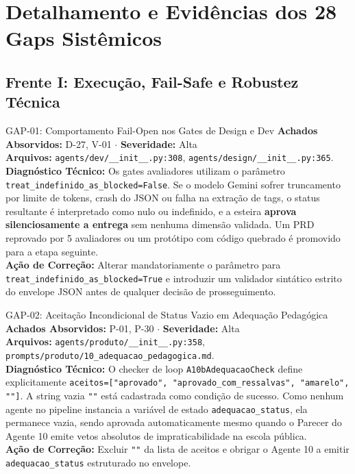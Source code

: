 \documentclass[11pt,a4paper]{article}
\begin{document}
\newpage
\section{Detalhamento e Evidências dos 28 Gaps Sistêmicos}

\subsection{Frente I: Execução, Fail-Safe e Robustez Técnica}

\begin{gapbox}{GAP-01: Comportamento Fail-Open nos Gates de Design e Dev}
\textbf{Achados Absorvidos:} D-27, V-01 $\cdot$ \textbf{Severidade:} Alta\\
\textbf{Arquivos:} \texttt{agents/dev/\_\_init\_\_.py:308}, \texttt{agents/design/\_\_init\_\_.py:365}.\\
\textbf{Diagnóstico Técnico:} Os gates avaliadores utilizam o parâmetro \texttt{treat\_indefinido\_as\_blocked=False}. Se o modelo Gemini sofrer truncamento por limite de tokens, crash do JSON ou falha na extração de tags, o status resultante é interpretado como nulo ou indefinido, e a esteira \textbf{aprova silenciosamente a entrega} sem nenhuma dimensão validada. Um PRD reprovado por 5 avaliadores ou um protótipo com código quebrado é promovido para a etapa seguinte.\\
\textbf{Ação de Correção:} Alterar mandatoriamente o parâmetro para \texttt{treat\_indefinido\_as\_blocked=True} e introduzir um validador sintático estrito do envelope JSON antes de qualquer decisão de prosseguimento.
\end{gapbox}

\begin{gapbox}{GAP-02: Aceitação Incondicional de Status Vazio em Adequação Pedagógica}
\textbf{Achados Absorvidos:} P-01, P-30 $\cdot$ \textbf{Severidade:} Alta\\
\textbf{Arquivos:} \texttt{agents/produto/\_\_init\_\_.py:358}, \texttt{prompts/produto/10\_adequacao\_pedagogica.md}.\\
\textbf{Diagnóstico Técnico:} O checker de loop \texttt{A10bAdequacaoCheck} define explicitamente \texttt{aceitos=["aprovado", "aprovado\_com\_ressalvas", "amarelo", ""]}. A string vazia \texttt{""} está cadastrada como condição de sucesso. Como nenhum agente no pipeline instancia a variável de estado \texttt{adequacao\_status}, ela permanece vazia, sendo aprovada automaticamente mesmo quando o Parecer do Agente 10 emite vetos absolutos de impraticabilidade na escola pública.\\
\textbf{Ação de Correção:} Excluir \texttt{""} da lista de aceitos e obrigar o Agente 10 a emitir \texttt{adequacao\_status} estruturado no envelope.
\end{gapbox}
\end{document}
